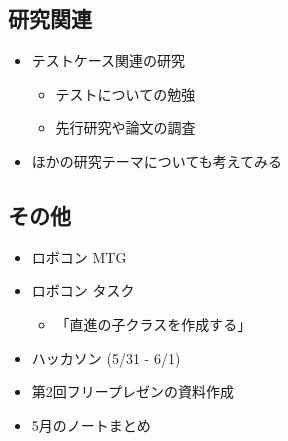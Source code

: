 \documentclass[uplatex, onecolumn, 10pt]{jsarticle}
\begin{document}
\subsection*{研究関連}
\begin{itemize}
	\item テストケース関連の研究
	\begin{itemize}
        \item テストについての勉強
        \item 先行研究や論文の調査
    \end{itemize} 
    \item ほかの研究テーマについても考えてみる
\end{itemize}

\subsection*{その他}
\begin{itemize}
    \item ロボコン MTG
    \item ロボコン タスク
	\begin{itemize}
        \item 「直進の子クラスを作成する」
    \end{itemize}
    \item ハッカソン (5/31 - 6/1)
    \item 第2回フリープレゼンの資料作成
    \item 5月のノートまとめ
\end{itemize}
\end{document}
